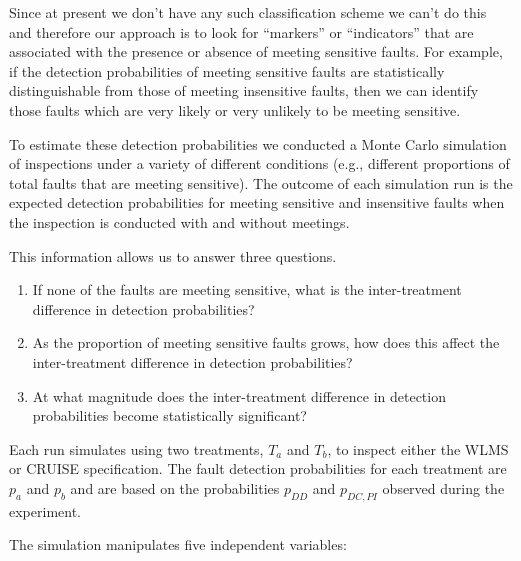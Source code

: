Since at present we don't have any such classification scheme
we can't do this and therefore our approach is to look
for ``markers'' or ``indicators'' that are associated with the
presence or absence of meeting sensitive faults.
For example, if the detection probabilities of meeting sensitive 
faults are statistically distinguishable from
those of meeting insensitive faults, then we can identify 
those faults which are very likely or very unlikely to be
meeting sensitive.  

To estimate these detection probabilities we conducted a
Monte Carlo simulation of inspections under a variety of 
different conditions (e.g., different proportions of 
total faults that are meeting sensitive). The outcome of each 
simulation run is the expected detection probabilities for meeting
sensitive and insensitive faults when the inspection is conducted 
with and without meetings.  

This information allows us to answer three questions.

\begin{enumerate}

\item If none of the faults are meeting sensitive, what is the 
inter-treatment difference in detection probabilities?

\item As the proportion of meeting sensitive faults grows, how
does this affect the inter-treatment difference in detection probabilities?

\item At what magnitude does the inter-treatment difference 
in detection probabilities become statistically significant?

\end{enumerate}



Each run simulates using two treatments, $T_a$ and $T_b$,
to inspect either the WLMS or CRUISE specification. 
The fault detection probabilities for each treatment 
are $p_a$ and $p_b$ and are based on the probabilities
$p_{DD}$ and $p_{DC,PI}$ observed during the experiment.   

The simulation manipulates five independent variables:

